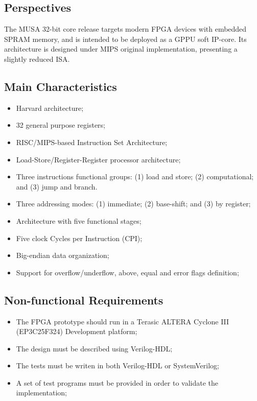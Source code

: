 \documentclass{article}
\begin{document}
 \subsection{Perspectives}
    
  The MUSA 32-bit core release targets modern FPGA devices with embedded SPRAM memory, and is intended to be deployed as a GPPU soft IP-core. Its architecture is designed under MIPS original implementation, presenting a slightly reduced ISA.
  
  \subsection{Main Characteristics}
  
  \begin{itemize}
   \item Harvard architecture;
   \item 32 general purpose registers;
   \item RISC/MIPS-based Instruction Set Architecture;
   \item Load-Store/Register-Register processor architecture;
   \item Three instructions functional groups: (1) load and store; (2) computational; and (3) jump and branch.
   \item Three addressing modes: (1) immediate; (2) base-shift; and (3) by register;
   \item Architecture with five functional stages;
   \item Five clock Cycles per Instruction (CPI);
   \item Big-endian data organization;
   \item Support for overflow/underflow, above, equal and error flags definition;
  \end{itemize}

  \subsection{Non-functional Requirements}
  
  \begin{itemize}
   \item The FPGA prototype should run in a Terasic ALTERA Cyclone III (EP3C25F324) Development platform;
   \item The design must be described using Verilog-HDL;
   \item The tests must be writen in both Verilog-HDL or SystemVerilog;
   \item A set of test programs must be provided in order to validate the implementation;
  \end{itemize}
\end{document}

